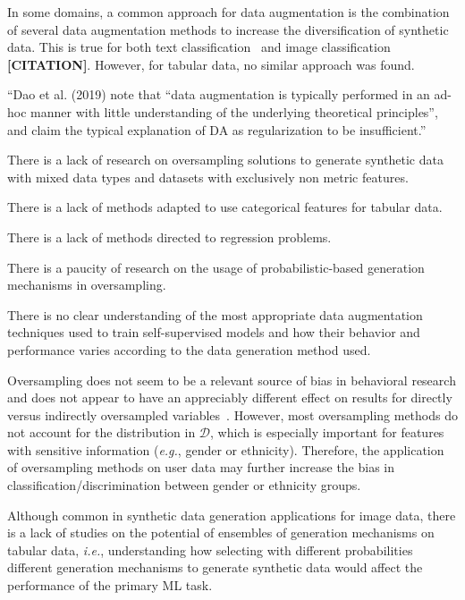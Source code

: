 \documentclass[parskip=full]{scrartcl}
\begin{document}
In some domains, a common approach for data augmentation is the combination of
several data augmentation methods to increase the diversification of synthetic
data. This is true for both text classification~\cite{bayer2021survey} and
image classification \textbf{[CITATION]}.  However, for tabular data, no
similar approach was found.


``Dao et al. (2019) note that ``data augmentation is typically performed in an
ad-hoc manner with little understanding of the underlying theoretical
principles'', and claim the typical explanation of DA as regularization to be
insufficient.''~\cite{feng2021survey}

There is a lack of research on oversampling solutions to generate synthetic
data with mixed data types and datasets with exclusively non metric features.

There is a lack of methods adapted to use categorical features for tabular
data.

There is a lack of methods directed to regression problems.

There is a paucity of research on the usage of probabilistic-based generation
mechanisms in oversampling.



There is no clear understanding of the most appropriate data augmentation
techniques used to train self-supervised models and how their behavior and
performance varies according to the data generation method used.


Oversampling does not seem to be a relevant source of bias in behavioral
research and does not appear to have an appreciably different effect on
results for directly versus indirectly oversampled
variables~\cite{hauner2014latent}. However, most oversampling methods do not
account for the distribution in $\mathcal{D}$, which is especially important
for features with sensitive information (\textit{e.g.}, gender or ethnicity).
Therefore, the application of oversampling methods on user data may further
increase the bias in classification/discrimination between gender or ethnicity
groups.

Although common in synthetic data generation applications for image data,
there is a lack of studies on the potential of ensembles of generation
mechanisms on tabular data, \textit{i.e.}, understanding how selecting with
different probabilities different generation mechanisms to generate synthetic
data would affect the performance of the primary ML task.
\end{document}
